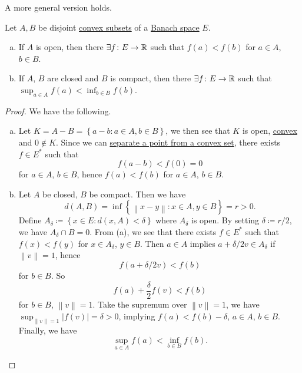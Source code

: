 A more general version holds.

\begin{theorem}\label{thm:separation-of-convex-sets}
	Let \(A, B\) be disjoint \hyperref[def:convex-set]{convex subsets} of a \hyperref[def:Banach-space]{Banach space} \(E\).
	\begin{enumerate}[(a)]
		\item If \(A\) is open, then there \(\exists f\colon E\to \mathbb{\MakeUppercase{r}} \) such that \(f(a) < f(b)\) for \(a\in A\), \(b\in B\).
		\item If \(A\), \(B\) are closed and \(B\) is compact, then there \(\exists f\colon E\to \mathbb{\MakeUppercase{r}} \) such that \(\sup _{a\in A} f(a) < \inf _{b\in B}f(b)\).
	\end{enumerate}
\end{theorem}
\begin{proof}
	We have the following.
	\begin{enumerate}[(a)]
		\item Let \(K = A - B = \left\{ a - b\colon a\in A, b\in B \right\} \), we then see that \(K\) is open, \hyperref[def:convex-set]{convex} and \(0 \notin K\). Since we can \hyperref[thm:separation-of-a-point-from-a-convex-set]{separate a point from a convex set}, there exists \(f\in E^{\ast} \) such that
		      \[
			      f(a - b) < f(0) = 0
		      \]
		      for \(a\in A\), \(b\in B\), hence \(f(a) < f(b)\) for \(a\in A\), \(b\in B\).
		\item Let \(A\) be closed, \(B\) be compact. Then we have
		      \[
			      d(A, B) = \inf \left\{ \left\lVert x-y\right\rVert \colon x\in A, y\in B \right\} = r > 0.
		      \]
		      Define \(A_\delta \coloneqq \left\{ x\in E\colon d(x, A) < \delta  \right\} \) where \(A_\delta \) is open. By setting \(\delta \coloneqq r / 2\), we have \(A_\delta \cap B = 0\). From (a), we see that there exists \(f\in E^{\ast} \) such that \(f(x) < f(y)\) for \(x\in A_\delta \), \(y\in B\). Then \(a\in A\) implies \(a + \delta /2 v \in A_\delta \) if \(\left\lVert v\right\rVert = 1\), hence
		      \[
			      f(a + \delta / 2 v)< f(b)
		      \]
		      for \(b\in B\). So
		      \[
			      f(a) + \frac{\delta }{2}f(v) < f(b)
		      \]
		      for \(b\in B\), \(\left\lVert v\right\rVert = 1\). Take the supremum over \(\left\lVert v\right\rVert = 1\), we have \(\sup _{\left\lVert v\right\rVert = 1} \left\vert f(v) \right\vert = \delta > 0\), implying \(f(a) < f(b) - \delta \), \(a\in A\), \(b\in B\). Finally, we have
		      \[
			      \sup _{a\in A}f(a) < \inf _{b\in B}f(b).
		      \]
	\end{enumerate}
\end{proof}